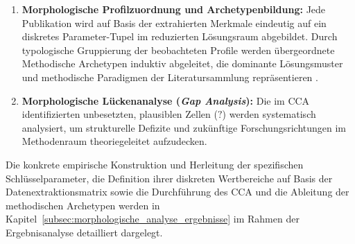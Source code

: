 \begin{enumerate}[label=\textbf{Phase \arabic*:}, leftmargin=*]
  \begin{itemize}[leftmargin=*]
    \item \textbf{Empirisch beobachtet ($O$ -- \textit{Observed}):} Die Parameterkombination ist in der Literatur real dokumentiert und nachgewiesen.
    \item \textbf{Logisch/strukturell inkonsistent ($X$ -- \textit{Incompatible}):} Die Kombination beinhaltet einen inhärenten logischen oder rechnerischen Widerspruch.
    \item \textbf{Plausibel, unbesetzt ($?$ -- \textit{Plausible Innovation Space}):} Die Kombination ist logisch konsistent und methodisch wünschenswert, wird jedoch in der aktuellen Literatur nicht adressiert.
  \end{itemize}
  \item \textbf{Morphologische Profilzuordnung und Archetypenbildung:} Jede Publikation wird auf Basis der extrahierten Merkmale eindeutig auf ein diskretes Parameter-Tupel im reduzierten Lösungsraum abgebildet. Durch typologische Gruppierung der beobachteten Profile werden übergeordnete Methodische Archetypen induktiv abgeleitet, die dominante Lösungsmuster und methodische Paradigmen der Literatursammlung repräsentieren \parencite[S.~87 bis 90]{Z6N6V5L9}.
  \item \textbf{Morphologische Lückenanalyse (\textit{Gap Analysis}):} Die im CCA identifizierten unbesetzten, plausiblen Zellen ($?$) werden systematisch analysiert, um strukturelle Defizite und zukünftige Forschungsrichtungen im Methodenraum theoriegeleitet aufzudecken.
\end{enumerate}

Die konkrete empirische Konstruktion und Herleitung der spezifischen Schlüsselparameter, die Definition ihrer diskreten Wertbereiche auf Basis der Datenextraktionsmatrix sowie die Durchführung des CCA und die Ableitung der methodischen Archetypen werden in Kapitel~\ref{subsec:morphologische_analyse_ergebnisse} im Rahmen der Ergebnisanalyse detailliert dargelegt.
